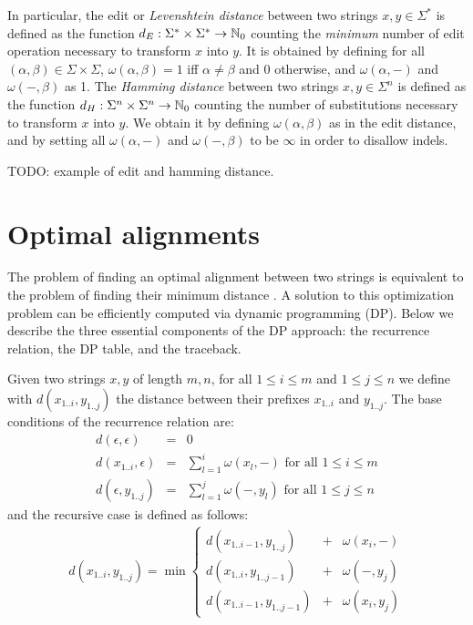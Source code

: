 In particular, the edit or \emph{Levenshtein distance} between two strings $x,y \in \Sigma^{*}$ is defined as the function $d_E : \Sigma^{*} \times \Sigma^{*} \rightarrow \mathbb {N}_0$ counting the \emph{minimum} number of edit operation necessary to transform $x$ into $y$.
It is obtained by defining for all $(\alpha,\beta) \in \Sigma \times \Sigma$, $\omega(\alpha,\beta) = 1$ iff $\alpha \neq \beta$ and 0 otherwise, and $\omega(\alpha,-)$ and $\omega(-,\beta)$ as 1.
The \emph{Hamming distance} between two strings $x,y \in \Sigma^{n}$ is defined as the function $d_H : \Sigma^{n} \times \Sigma^{n} \rightarrow \mathbb {N}_0$ counting the number of substitutions necessary to transform $x$ into $y$.
We obtain it by defining $\omega(\alpha,\beta)$ as in the edit distance, and by setting all $\omega(\alpha,-)$ and $\omega(-,\beta)$ to be $\infty$ in order to disallow indels.

\begin{example}
TODO: example of edit and hamming distance.
\end{example}

\section{Optimal alignments}

The problem of finding an optimal alignment between two strings is equivalent to the problem of finding their minimum distance \citep{Gusfield1997}.
A solution to this optimization problem can be efficiently computed via dynamic programming (DP).
Below we describe the three essential components of the DP approach: the recurrence relation, the DP table, and the traceback.

Given two strings $x,y$ of length $m,n$, for all $1 \leq i \leq m$ and $1 \leq j \leq n$ we define with $d(x_{1..i},y_{1..j})$ the distance between their prefixes $x_{1..i}$ and $y_{1..j}$.
The base conditions of the recurrence relation are:
\begin{eqnarray}
d(\epsilon,\epsilon)&=&0\\
d(x_{1..i},\epsilon)&=&\sum_{l=1}^{i}{\omega(x_l, -)} \text{ for all } 1 \leq i \leq m\\
d(\epsilon, y_{1..j})&=&\sum_{l=1}^{j}{\omega(-, y_l)} \text{ for all } 1 \leq j \leq n
\end{eqnarray}
and the recursive case is defined as follows:
\begin{eqnarray}
d(x_{1..i},y_{1..j}) = \min \left\{
\begin{array}{lcl}
d(x_{1..i-1},y_{1..j})&+&\omega(x_i, -)\\
d(x_{1..i},y_{1..j-1})&+&\omega(-, y_j)\\
d(x_{1..i-1},y_{1..j-1})&+&\omega(x_i, y_j)
\end{array}
\right.\label{eq:dp-min}
\end{eqnarray}

